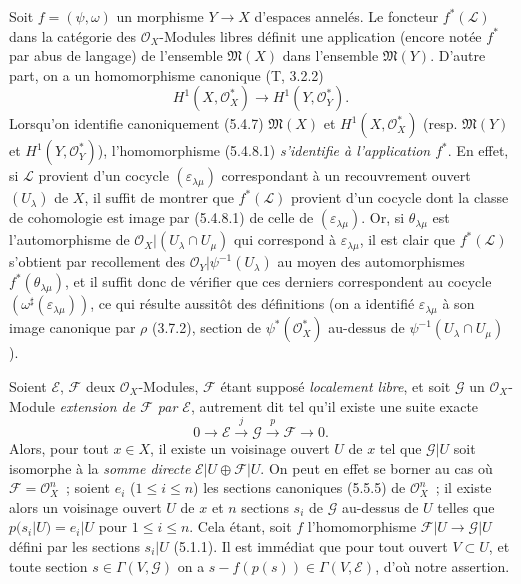 \begin{env}[5.4.8]
\label{0.5.4.8-fr}
Soit $f=(\psi,\omega)$ un morphisme $Y\to X$ d'espaces annelés. Le foncteur
$f^*(\mathcal{L})$ dans la catégorie des $\mathcal{O}_X$-Modules libres
définit une application (encore notée $f^*$ par abus de langage) de l'ensemble
$\mathfrak{M}(X)$ dans l'ensemble $\mathfrak{M}(Y)$. D'autre part, on a un
homomorphisme canonique (T, 3.2.2)
\[
  H^1(X,\mathcal{O}_X^*)\longrightarrow H^1(Y,\mathcal{O}_Y^*).
  \tag{5.4.8.1}\label{0.5.4.8.1-fr}
\]
Lorsqu'on identifie canoniquement (5.4.7) $\mathfrak{M}(X)$ et
$H^1(X,\mathcal{O}_X^*)$ (resp. $\mathfrak{M}(Y)$ et
$H^1(Y,\mathcal{O}_Y^*)$), l'homomorphisme (5.4.8.1) \emph{s'identifie à
l'application $f^*$}. En effet, si $\mathcal{L}$ provient d'un cocycle
$(\varepsilon_{\lambda\mu})$ correspondant à un recouvrement ouvert
$(U_\lambda)$ de $X$, il suffit de montrer que $f^*(\mathcal{L})$ provient
d'un cocycle dont la classe de cohomologie est image par (5.4.8.1) de celle de
$(\varepsilon_{\lambda\mu})$. Or, si $\theta_{\lambda\mu}$ est
l'automorphisme de $\mathcal{O}_X|(U_\lambda\cap U_\mu)$ qui correspond à
$\varepsilon_{\lambda\mu}$, il est clair que $f^*(\mathcal{L})$ s'obtient par
recollement des $\mathcal{O}_Y|\psi^{-1}(U_\lambda)$ au moyen des
automorphismes $f^*(\theta_{\lambda\mu})$, et il suffit donc de vérifier que
ces derniers correspondent au cocycle
$(\omega^\sharp(\varepsilon_{\lambda\mu}))$, ce qui résulte aussitôt des
définitions (on a identifié $\varepsilon_{\lambda\mu}$ à son image canonique
par $\rho$ (3.7.2), section de $\psi^*(\mathcal{O}_X^*)$ au-dessus de
$\psi^{-1}(U_\lambda\cap U_\mu)$).
\end{env}

\begin{env}[5.4.9]
\label{0.5.4.9-fr}
Soient $\mathcal{E}$, $\mathcal{F}$ deux $\mathcal{O}_X$-Modules,
$\mathcal{F}$ étant supposé \emph{localement libre}, et soit $\mathcal{G}$ un
$\mathcal{O}_X$-Module \emph{extension de $\mathcal{F}$ par $\mathcal{E}$},
autrement dit tel qu'il existe une suite exacte
\[
  0\longrightarrow\mathcal{E}\xrightarrow{j}\mathcal{G}
  \xrightarrow{p}\mathcal{F}\longrightarrow 0.
\]
Alors, pour tout $x\in X$, il existe un voisinage ouvert $U$ de $x$ tel que
$\mathcal{G}|U$ soit isomorphe à la \emph{somme directe}
$\mathcal{E}|U\oplus\mathcal{F}|U$. On peut en effet se borner au cas où
$\mathcal{F}=\mathcal{O}_X^n$~; soient $e_i$ ($1\leq i\leq n$) les sections
canoniques (5.5.5) de $\mathcal{O}_X^n$~; il existe alors un voisinage ouvert
$U$ de $x$ et $n$ sections $s_i$ de $\mathcal{G}$ au-dessus de $U$ telles que
$p(s_i|U)=e_i|U$ pour $1\leq i\leq n$. Cela étant, soit $f$
l'homomorphisme $\mathcal{F}|U\to\mathcal{G}|U$ défini par les sections
$s_i|U$ (5.1.1). Il est immédiat que pour tout ouvert $V\subset U$, et toute
section $s\in\Gamma(V,\mathcal{G})$ on a
$s-f(p(s))\in\Gamma(V,\mathcal{E})$, d'où notre assertion.
\end{env}

